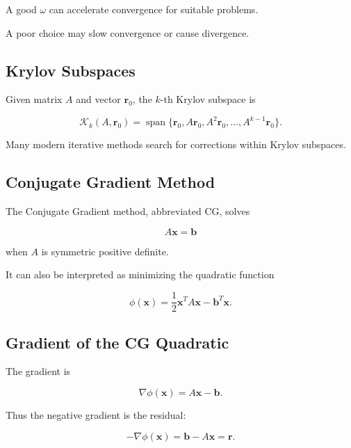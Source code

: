 A good \(\omega\) can accelerate convergence for suitable problems.

A poor choice may slow convergence or cause divergence.

\subsection{Krylov Subspaces}
\label{subsec:krylov-subspaces}

Given matrix \(A\) and vector \(\mathbf{r}_0\), the \(k\)-th Krylov
subspace is

\[
\boxed{
\mathcal{K}_k
(
A,\mathbf{r}_0
)
=
\operatorname{span}
\{
\mathbf{r}_0,
A\mathbf{r}_0,
A^2\mathbf{r}_0,
\ldots,
A^{k-1}\mathbf{r}_0
\}.
}
\]

Many modern iterative methods search for corrections within Krylov
subspaces.

\subsection{Conjugate Gradient Method}
\label{subsec:conjugate-gradient}

The Conjugate Gradient method, abbreviated CG, solves

\[
\boxed{
A\mathbf{x}
=
\mathbf{b}
}
\]

when \(A\) is symmetric positive definite.

It can also be interpreted as minimizing the quadratic function

\[
\boxed{
\phi(\mathbf{x})
=
\frac12
\mathbf{x}^TA\mathbf{x}
-
\mathbf{b}^T\mathbf{x}.
}
\]

\subsection{Gradient of the CG Quadratic}
\label{subsec:cg-gradient}

The gradient is

\[
\boxed{
\nabla\phi(\mathbf{x})
=
A\mathbf{x}
-
\mathbf{b}.
}
\]

Thus the negative gradient is the residual:

\[
\boxed{
-\nabla\phi(\mathbf{x})
=
\mathbf{b}
-
A\mathbf{x}
=
\mathbf{r}.
}
\]

